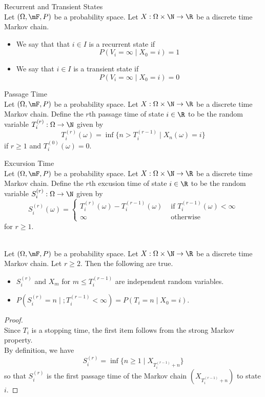 \documentclass[a4paper]{article}
\begin{document}
\begin{defn}{Recurrent and Transient States}{}\\
Let $(\Omega,\mF,P)$ be a probability space. Let $X:\Omega\times\N\to\R$ be a discrete time Markov chain. 
\begin{itemize}
\item We say that that $i\in I$ is a recurrent state if $$P(V_i=\infty\;|\;X_0=i)=1$$
\item We say that $i\in I$ is a transient state if $$P(V_i=\infty\;|\;X_0=i)=0$$
\end{itemize}
\end{defn}

\begin{defn}{Passage Time}{}\\
Let $(\Omega,\mF,P)$ be a probability space. Let $X:\Omega\times\N\to\R$ be a discrete time Markov chain. Define the $r$th passage time of state $i\in\R$ to be the random variable $T_i^{(r)}:\Omega\to\N$ given by $$T_i^{(r)}(\omega)=\inf\{n> T_i^{(r-1)}\;|\;X_n(\omega)=i\}$$ if $r\geq 1$ and $T_i^{(0)}(\omega)=0$. 
\end{defn}

\begin{defn}{Excursion Time}{}\\
Let $(\Omega,\mF,P)$ be a probability space. Let $X:\Omega\times\N\to\R$ be a discrete time Markov chain. Define the $r$th excusion time of state $i\in\R$ to be the random variable $S_i^{(r)}:\Omega\to\N$ given by $$S_i^{(r)}(\omega)=\begin{cases}
T_i^{(r)}(\omega)-T_i^{(r-1)}(\omega) & \text{ if }T_i^{(r-1)}(\omega)<\infty\\
\infty & \text{ otherwise }
\end{cases}$$ for $r\geq 1$. 
\end{defn}

\begin{lmm}{}{}\\
Let $(\Omega,\mF,P)$ be a probability space. Let $X:\Omega\times\N\to\R$ be a discrete time Markov chain. Let $r\geq 2$. Then the following are true. 
\begin{itemize}
\item $S_i^{(r)}$ and $X_m$ for $m\leq T_i^{(r-1)}$ are independent random variables. 
\item $P(S_i^{(r)}=n\;|\;;T_i^{(r-1)}<\infty)=P(T_i=n\;|\;X_0=i)$. 
\end{itemize}
\begin{proof}\\
Since $T_i$ is a stopping time, the first item follows from the strong Markov property. \\

By definition, we have $$S_i^{(r)}=\inf\{n\geq 1\;|\;X_{T_i^{(r-1)}+n}\}$$ so that $S_i^{(r)}$ is the first passage time of the Markov chain $(X_{T_i^{(r-1)}+n})$ to state $i$. 
\end{proof}
\end{lmm}
\end{document}
